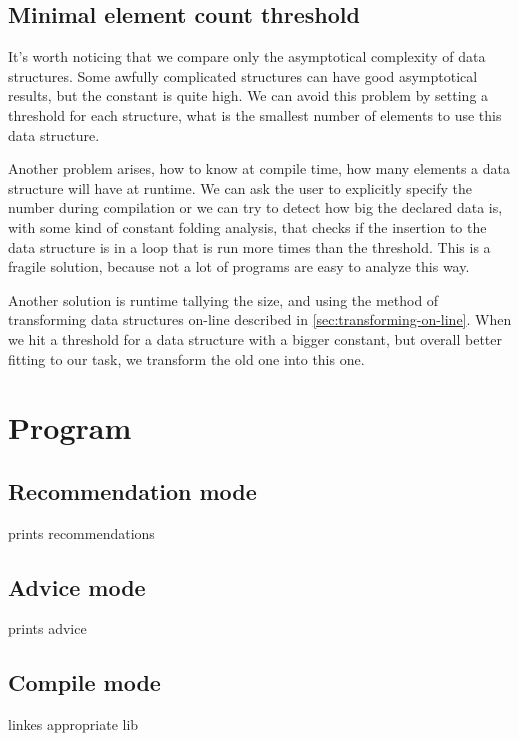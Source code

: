 \documentclass[11pt]{article}
\begin{document}
	\subsection{Minimal element count threshold}

		It's worth noticing that we compare only the asymptotical complexity of data structures. Some awfully
		complicated structures can have good asymptotical results, but the constant is quite high. We can avoid
		this problem by setting a threshold for each structure, what is the smallest number of elements to use
		this data structure.

		Another problem arises, how to know at compile time, how many elements a data structure will have at
		runtime. We can ask the user to explicitly specify the number during compilation or we can try to
		detect how big the declared data is, with some kind of constant folding analysis, that checks if the
		insertion to the data structure is in a loop that is run more times than the threshold. This is a fragile
		solution, because not a lot of programs are easy to analyze this way.

		Another solution is runtime tallying the size, and using the method of transforming data structures
		on-line described in \autoref{sec:transforming-on-line}. When we hit a threshold for a data structure
		with a bigger constant, but overall better fitting to our task, we transform the old one into this one.

\section{Program}

	\subsection{Recommendation mode}

		prints recommendations

	\subsection{Advice mode}

		prints advice

	\subsection{Compile mode}

		linkes appropriate lib
\end{document}
